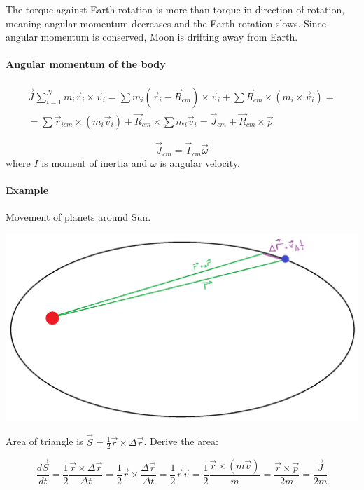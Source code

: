 The torque against Earth rotation is more than torque in direction of rotation, meaning angular momentum decreases and the Earth rotation slows. Since angular momentum is conserved, Moon is drifting away from Earth.

\paragraph{Angular momentum of the body} 

\begin{align*}
\vec{J} \sum_{i=1}^{N} m_i \vec{r}_i \times \vec{v}_i = \sum m_i \left( \vec{r}_i - \vec{R}_{cm} \right) \times \vec{v}_i + \sum \vec{R}_{cm} \times \left( m_i \times \vec{v}_i \right) = \\ = \sum \vec{r}_{icm} \times \left( m_i \vec{v}_i \right) + \vec{R}_{cm} \times \sum m_i \vec{v}_i = \vec{J}_{cm} + \vec{R}_{cm} \times \vec{p}
\end{align*}

$$\vec{J}_{cm} =\vec{I}_{cm} \vec{\omega}$$
where $I$ is moment of inertia and $\omega$ is angular velocity.

\paragraph{Example} Movement of planets around Sun.
\begin{center}
	\includegraphics[width=\linewidth]{./lect14/pic4.png}
\end{center}

Area of triangle is $\vec{S} = \frac{1}{2} \vec{r} \times \Delta \vec{r}$. Derive the area:

$$\frac{d\vec{S}}{dt} = \frac{1}{2} \frac{\vec{r}  \times \Delta \vec{r}}{\Delta t} = \frac{1}{2} \vec{r} \times \frac{\Delta \vec{r}}{\Delta t} = \frac{1}{2} \vec{r} \vec{v} = \frac{1}{2} \frac{\vec{r} \times \left( m \vec{v} \right)}{m} = \frac{\vec{r} \times \vec{p}}{2m} = \frac{\vec{J}}{2m}$$

